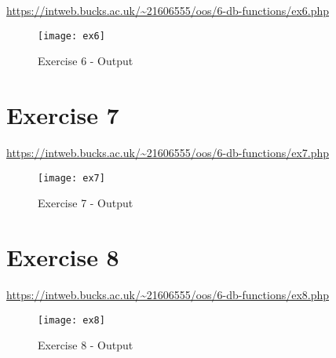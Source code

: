 \url{https://intweb.bucks.ac.uk/~21606555/oos/6-db-functions/ex6.php}

\captionsetup{type=figure}


\captionsetup{type=figure}


\begin{figure}[H]
  \caption{Exercise 6 - Output}
  \centering
  \texttt{[image: ex6]}
\end{figure}

\clearpage
\section{Exercise 7}

\url{https://intweb.bucks.ac.uk/~21606555/oos/6-db-functions/ex7.php}

\captionsetup{type=figure}


\captionsetup{type=figure}


\begin{figure}[H]
  \caption{Exercise 7 - Output}
  \centering
  \texttt{[image: ex7]}
\end{figure}

\clearpage
\section{Exercise 8}

\url{https://intweb.bucks.ac.uk/~21606555/oos/6-db-functions/ex8.php}

\captionsetup{type=figure}


\captionsetup{type=figure}


\begin{figure}[H]
  \caption{Exercise 8 - Output}
  \centering
  \texttt{[image: ex8]}
\end{figure}
